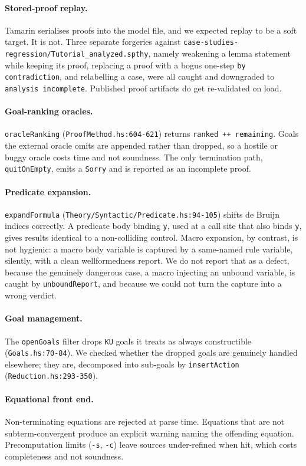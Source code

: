 \documentclass[version=preprint]{iacrcc}
\newcommand{\code}[1]{\texttt{\small #1}}
\theoremstyle{definition}
\theoremstyle{remark}
\begin{document}
\paragraph{Stored-proof replay.} Tamarin serialises proofs into the model file,
and we expected replay to be a soft target. It is not. Three separate forgeries
against \code{case-studies-regression/Tutorial\_analyzed.spthy}, namely
weakening a lemma statement while keeping its proof, replacing a proof with a
bogus one-step \code{by contradiction}, and relabelling a case, were all caught
and downgraded to \code{analysis incomplete}. Published proof artifacts do get
re-validated on load.

\paragraph{Goal-ranking oracles.} \code{oracleRanking}
(\code{ProofMethod.hs:604-621}) returns \code{ranked ++ remaining}. Goals the
external oracle omits are appended rather than dropped, so a hostile or buggy
oracle costs time and not soundness. The only termination path,
\code{quitOnEmpty}, emits a \code{Sorry} and is reported as an incomplete proof.

\paragraph{Predicate expansion.} \code{expandFormula}
(\code{Theory/Syntactic/Predicate.hs:94-105}) shifts de Bruijn indices
correctly. A predicate body binding \code{y}, used at a call site that also
binds \code{y}, gives results identical to a non-colliding control. Macro
expansion, by contrast, is not hygienic: a macro body variable is captured by a
same-named rule variable, silently, with a clean wellformedness report. We do
not report that as a defect, because the genuinely dangerous case, a macro
injecting an unbound variable, is caught by \code{unboundReport}, and because
we could not turn the capture into a wrong verdict.

\paragraph{Goal management.} The \code{openGoals} filter drops \code{KU} goals
it treats as always constructible (\code{Goals.hs:70-84}). We checked whether
the dropped goals are genuinely handled elsewhere; they are, decomposed into
sub-goals by \code{insertAction} (\code{Reduction.hs:293-350}).

\paragraph{Equational front end.} Non-terminating equations are rejected at
parse time. Equations that are not subterm-convergent produce an explicit
warning naming the offending equation. Precomputation limits (\code{-s},
\code{-c}) leave sources under-refined when hit, which costs completeness and
not soundness.
\end{document}
